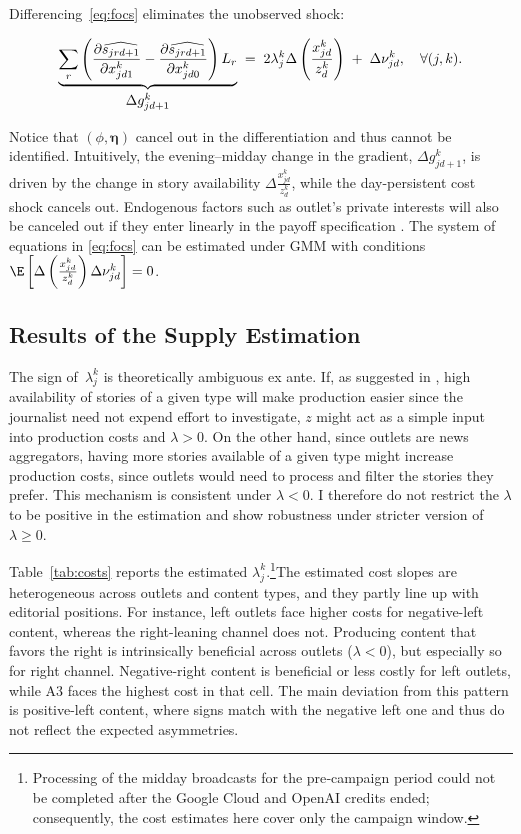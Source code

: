 \documentclass[12pt]{article}
\begin{document}
Differencing~\eqref{eq:focs} eliminates the unobserved shock:

\begin{equation}\label{eq:diff_foc}
	\underbrace{%
		\sum_{r}\left(
		\frac{\partial \widehat{s_{jrd+1}}}{\partial x_{jd1}^k}
		-
		\frac{\partial \widehat{s_{jrd+1}}}{\partial x_{jd0}^k}
		\right)L_r
	}_{\textstyle \Delta g_{jd+1}^k}
	\;=\;
	2\lambda_j^k
\Delta	
\left( \frac{x_{jd}^k }{z_{d}^k } \right)
	\;+\;
	\Delta\nu_{jd}^k,
	\quad \forall (j,k).
\end{equation}



Notice that $\left(\phi,\bm\eta \right)$ cancel out in the differentiation and thus cannot be identified.  Intuitively, the evening–midday change in the gradient, $\Delta g_{jd+1}^k$, is driven by the change in story availability $\Delta	
\frac{x_{jd}^k }{z_{d}^k }$, while the day-persistent cost shock cancels out. Endogenous factors  such as outlet's private interests will also be canceled out if they enter linearly in the payoff specification \citep[see e.g.][]{Anderson2010MediaMA}. The system of equations in \ref{eq:focs} can be estimated under GMM with conditions $\E \left[\Delta  \left( \frac{x_{jd}^k}{z_{d}^k} \right)  \Delta\nu_{jd}^k \right]= 0 $. 



\subsection{Results of the Supply Estimation}

 The sign of~$\lambda_j^k$ is theoretically ambiguous ex ante. If, as suggested in \cite{SimonovRao2022}, high availability of stories of a given type will make production easier since the journalist need not expend effort to investigate,  $z$ might act as a simple input into production costs and $ \lambda>0$. On the other hand, since outlets are news aggregators, having more stories available of a given type might increase production costs, since outlets would need to process and filter the stories they prefer. This mechanism is consistent under $ \lambda<0$. I therefore do not restrict the $\lambda$ to be positive in the estimation and show robustness under stricter version of $\lambda \geq0$.


Table~\ref{tab:costs} reports the estimated $\lambda_j^k$.\footnote{Processing of the midday broadcasts for the pre‑campaign period could not be completed after the Google Cloud and OpenAI credits ended; consequently, the cost estimates here cover only the campaign window. }The estimated cost slopes are heterogeneous across outlets and content types, and they partly line up with editorial positions. For instance, left outlets face higher costs for negative-left content, whereas the right-leaning channel does not. Producing content that favors the right 
is intrinsically beneficial across outlets ($\lambda<0$), but especially so for right channel. Negative-right content is beneficial or less costly for left outlets, while A3 faces the highest cost in that cell. The main deviation from this pattern is positive-left content, where signs match with the negative left one and thus do not reflect the expected asymmetries. 
\end{document}

